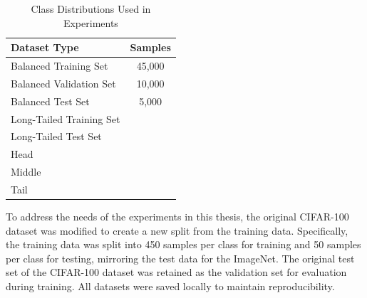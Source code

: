 \begin{table}[h!]
    \centering
    \caption{Class Distributions Used in Experiments}
    \label{tab:class_distributions}
    \begin{tabular}{|l|c|}
    \hline
    \textbf{Dataset Type}                       & \textbf{Samples}                                                                 \\ \hline
    Balanced Training Set                       & 45,000        \\ \hline
    Balanced Validation Set                     & 10,000    \\ \hline
    Balanced Test Set                           & 5,000    \\ \hline
    Long-Tailed Training Set                    & \todo{-}      \\ \hline
    Long-Tailed Test Set                        & \todo{-} \\ \hline
    Head  & \todo{-} \\ \hline
    Middle   & \todo{-} \\ \hline
    Tail  & \todo{-} \\ \hline
    \end{tabular}
    \end{table}
    

To address the needs of the experiments in this thesis, the original CIFAR-100 dataset was modified to create a new split from the training data. Specifically, the training data was split into 450 samples per class for training and 50 samples per class for testing, mirroring the test data for the ImageNet. The original test set of the CIFAR-100 dataset was retained as the validation set for evaluation during training. All datasets were saved locally to maintain reproducibility.




